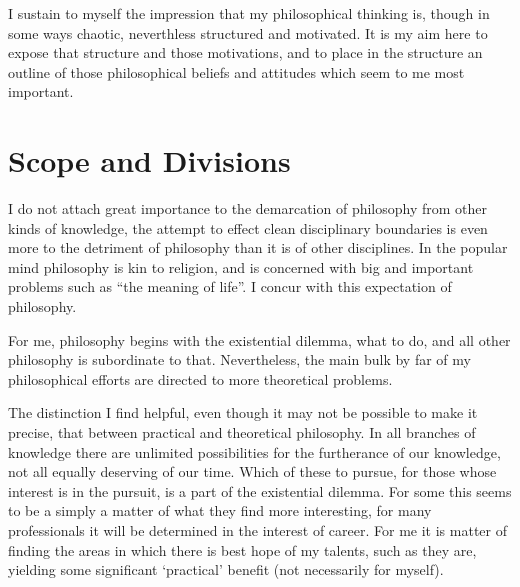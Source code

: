 I sustain to myself the impression that my philosophical thinking is, though in some ways chaotic, neverthless structured and motivated.
It is my aim here to expose that structure and those motivations, and to place in the structure an outline of those philosophical beliefs and attitudes which seem to me most important.

\section{Scope and Divisions}

I do not attach great importance to the demarcation of philosophy from other kinds of knowledge, the attempt to effect clean disciplinary boundaries is even more to the detriment of philosophy than it is of other disciplines.
In the popular mind philosophy is kin to religion, and is concerned with big and important problems such as ``the meaning of life''.
I concur with this expectation of philosophy.

For me, philosophy begins with the existential dilemma, what to do, and all other philosophy is subordinate to that.
Nevertheless, the main bulk by far of my philosophical efforts are directed to more theoretical problems.

The distinction I find helpful, even though it may not be possible to make it precise, that between practical and theoretical philosophy.
In all branches of knowledge there are unlimited possibilities for the furtherance of our knowledge, not all equally deserving of our time.
Which of these to pursue, for those whose interest is in the pursuit, is a part of the existential dilemma.
For some this seems to be a simply a matter of what they find more interesting, for many professionals it will be determined in the interest of career.
For me it is matter of finding the areas in which there is best hope of my talents, such as they are, yielding some significant `practical' benefit (not necessarily for myself).

